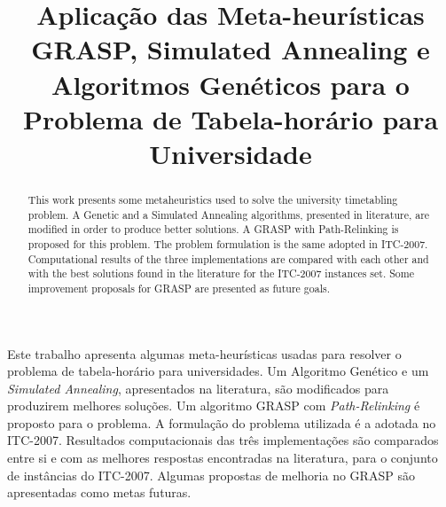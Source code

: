 \documentclass[11pt]{article}
\title{Aplicação das Meta-heurísticas GRASP, Simulated Annealing e Algoritmos Genéticos para o Problema de Tabela-horário para Universidade}
\begin{document}
 

\maketitle


\begin{resumo} 

 Este trabalho apresenta algumas meta-heurísticas usadas para resolver o problema de tabela-horário para universidades. Um Algoritmo Genético e um \textit{Simulated Annealing}, apresentados na literatura, são modificados para produzirem melhores soluções. Um algoritmo GRASP com \textit{Path-Relinking} é proposto para o problema. A formulação do problema utilizada é a adotada no ITC-2007. Resultados computacionais das três implementações são comparados entre si e com as melhores respostas encontradas na literatura, para o conjunto de instâncias do ITC-2007. Algumas propostas de melhoria no GRASP são apresentadas como metas futuras.
\end{resumo}



\begin{abstract}
  This work presents some metaheuristics used to solve the university timetabling problem. A Genetic and a Simulated Annealing algorithms, presented in literature, are modified in order to produce better solutions. A GRASP with Path-Relinking is proposed for this problem. The problem formulation is the same adopted in ITC-2007. Computational results of the three implementations are compared with each other and with the best solutions found in the literature  for the ITC-2007 instances set. Some improvement proposals for GRASP are presented as future goals.
\end{abstract}
\end{document}
